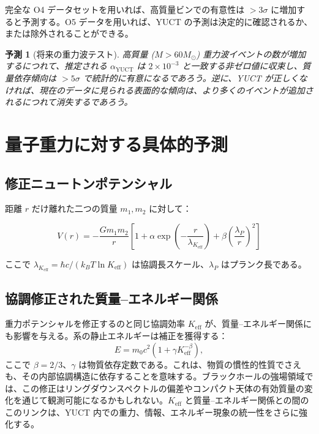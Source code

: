 \documentclass[11pt,a4paper]{article}
\newtheorem{prediction}[theorem]{予測}
\theoremstyle{remark}
\newcommand{\Keff}{K_{\mathrm{eff}}}
\begin{document}
	完全な O4 データセットを用いれば、高質量ビンでの有意性は $> 3\sigma$ に増加すると予測する。O5 データを用いれば、YUCT の予測は決定的に確認されるか、または除外されることができる。
	
	\begin{prediction}[将来の重力波テスト]
		高質量 ($M > 60 M_\odot$) 重力波イベントの数が増加するにつれて、推定される $\alpha_{\text{YUCT}}$ は $2\times 10^{-3}$ と一致する非ゼロ値に収束し、質量依存傾向は $> 5\sigma$ で統計的に有意になるであろう。逆に、YUCT が正しくなければ、現在のデータに見られる表面的な傾向は、より多くのイベントが追加されるにつれて消失するであろう。
	\end{prediction}
	
	\section{量子重力に対する具体的予測}
	\label{sec:predictions}
	
	\subsection{修正ニュートンポテンシャル}
	
	距離 $r$ だけ離れた二つの質量 $m_1, m_2$ に対して：
	
	\begin{equation}
		V(r) = -\frac{G m_1 m_2}{r} \left[ 1 + \alpha \exp\left(-\frac{r}{\lambda_{\Keff}}\right) + \beta \left(\frac{\lambda_P}{r}\right)^2 \right]
	\end{equation}
	
	ここで $\lambda_{\Keff} = \hbar c / (k_B T \ln \Keff)$ は協調長スケール、$\lambda_P$ はプランク長である。
	
	\subsection{協調修正された質量–エネルギー関係}
	\label{subsec:coord-emc2-G}
	
	重力ポテンシャルを修正するのと同じ協調効率 $\Keff$ が、質量–エネルギー関係にも影響を与える。系の静止エネルギーは補正を獲得する：
	\[
	E = m_{0} c^{2} \left(1 + \gamma K_{\mathrm{eff}}^{-\beta}\right),
	\]
	ここで $\beta = 2/3$、$\gamma$ は物質依存定数である。これは、物質の慣性的性質でさえも、その内部協調構造に依存することを意味する。ブラックホールの強場領域では、この修正はリングダウンスペクトルの偏差やコンパクト天体の有効質量の変化を通じて観測可能になるかもしれない。$\Keff$ と質量–エネルギー関係との間のこのリンクは、YUCT 内での重力、情報、エネルギー現象の統一性をさらに強化する。
	
\end{document}
